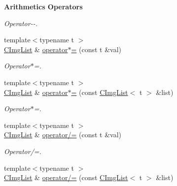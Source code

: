 \begin{Indent}{\bf Arithmetics Operators}
\begin{DoxyCompactItemize}
\begin{DoxyCompactList}\small\item\em Operator-\/-\/. \item\end{DoxyCompactList}\item 
\hypertarget{structcimg__library_1_1_c_img_list_a1b76541d5f5c71955a5d3b3db93b7ecb}{
{\footnotesize template$<$typename t $>$ }\\\hyperlink{structcimg__library_1_1_c_img_list}{CImgList} \& \hyperlink{structcimg__library_1_1_c_img_list_a1b76541d5f5c71955a5d3b3db93b7ecb}{operator$\ast$=} (const t \&val)}
\label{structcimg__library_1_1_c_img_list_a1b76541d5f5c71955a5d3b3db93b7ecb}

\begin{DoxyCompactList}\small\item\em Operator$\ast$=. \item\end{DoxyCompactList}\item 
\hypertarget{structcimg__library_1_1_c_img_list_a7162b4453590b3468db0f5c0b0d8738f}{
{\footnotesize template$<$typename t $>$ }\\\hyperlink{structcimg__library_1_1_c_img_list}{CImgList} \& \hyperlink{structcimg__library_1_1_c_img_list_a7162b4453590b3468db0f5c0b0d8738f}{operator$\ast$=} (const \hyperlink{structcimg__library_1_1_c_img_list}{CImgList}$<$ t $>$ \&list)}
\label{structcimg__library_1_1_c_img_list_a7162b4453590b3468db0f5c0b0d8738f}

\begin{DoxyCompactList}\small\item\em Operator$\ast$=. \item\end{DoxyCompactList}\item 
\hypertarget{structcimg__library_1_1_c_img_list_af1e4583962d17a76acfaa12309e0626d}{
{\footnotesize template$<$typename t $>$ }\\\hyperlink{structcimg__library_1_1_c_img_list}{CImgList} \& \hyperlink{structcimg__library_1_1_c_img_list_af1e4583962d17a76acfaa12309e0626d}{operator/=} (const t \&val)}
\label{structcimg__library_1_1_c_img_list_af1e4583962d17a76acfaa12309e0626d}

\begin{DoxyCompactList}\small\item\em Operator/=. \item\end{DoxyCompactList}\item 
\hypertarget{structcimg__library_1_1_c_img_list_abf226decc3bc5e97e422211b5ec7a963}{
{\footnotesize template$<$typename t $>$ }\\\hyperlink{structcimg__library_1_1_c_img_list}{CImgList} \& \hyperlink{structcimg__library_1_1_c_img_list_abf226decc3bc5e97e422211b5ec7a963}{operator/=} (const \hyperlink{structcimg__library_1_1_c_img_list}{CImgList}$<$ t $>$ \&list)}
\label{structcimg__library_1_1_c_img_list_abf226decc3bc5e97e422211b5ec7a963}


\end{DoxyCompactItemize}
\end{Indent}
